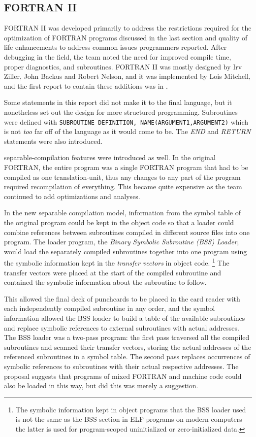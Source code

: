
\subsection{FORTRAN II}

FORTRAN II was developed primarily to address the restrictions required for the
optimization of FORTRAN programs discussed in the last section and quality of
life enhancements to address common issues programmers reported.
After debugging in the field, the team noted the need for improved compile time,
proper diagnostics, and subroutines.
FORTRAN II was mostly designed by Irv Ziller, John Backus and Robert Nelson,
and it was implemented by Lois Mitchell, and
the first report to contain these additions was  in
\citeyear{fortran_ii_proposal_1957}.

Some statements in this report did not make it to the final language, but it
nonetheless set out the design for more structured programming.
Subroutines were defined with \texttt{SUBROUTINE DEFINITION, NAME(ARGUMENT1,ARGUMENT2)}
which is not \textit{too} far off of the language as it would come to be.
The \textit{END} and \textit{RETURN} statements were also introduced.

\Gls{separable-compilation} features were introduced as well.
In the original FORTRAN, the entire program was a single FORTRAN program
that had to be compiled as one \gls{translation-unit}, thus any changes to any
part of the program required recompilation of everything.
This became quite expensive as the team continued to add optimizations
and analyses.

In the new separable compilation model,
information from the symbol table of the original program could be kept
in the object code so that a loader could combine references between subroutines
compiled in different source files into one program.
The loader program, the \textit{Binary Symbolic Subroutine (BSS) Loader},
would load the separately compiled subroutines together into one program using
the symbolic information kept in the \textit{transfer vectors} in object code.
\footnote{The symbolic information kept in object programs that the BSS loader
	used is not the same as the BSS section in ELF programs on modern computers--
	the latter is used for program-scoped uninitialized or zero-initialized data.}
The transfer vectors were placed at the start of the compiled subroutine and
contained the symbolic information about the subroutine to follow.

This allowed the final deck of punchcards to be placed in the card reader
with each independently compiled subroutine in any order, and the symbol information
allowed the BSS loader to build a table of the available subroutines and replace
symbolic references to external subroutines with actual addresses.
The BSS loader was a two-pass program: the first pass traversed all the compiled
subroutines and scanned their transfer vectors, storing the actual addresses of
the referenced subroutines in a symbol table.
The second pass replaces occurrences of symbolic references to subroutines
with their actual respective addresses.
The proposal suggests that programs of mixed FORTRAN and machine code could
also be loaded in this way, but did this was merely a suggestion.

